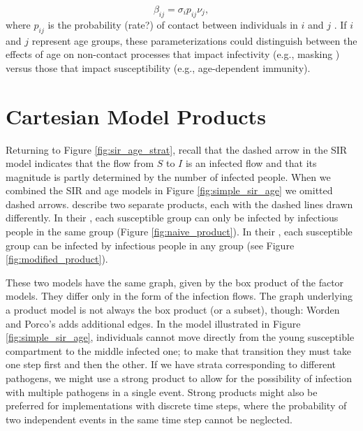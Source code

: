 \begin{equation}
    \beta_{ij} = \sigma_ip_{ij}\nu_j,
\end{equation}
where $p_{ij}$ is the probability (rate?) of contact between individuals in $i$ and $j$ . If $i$ and $j$ represent age groups, these parameterizations could distinguish between the effects of age on non-contact processes that impact infectivity (e.g., masking ) versus those that impact susceptibility (e.g., age-dependent immunity).

\section{Cartesian Model Products}\label{worden}

Returning to Figure \ref{fig:sir_age_strat}, recall that the dashed arrow in the SIR model indicates that the flow from $S$ to $I$ is an infected flow and that its magnitude is partly determined by the number of infected people. When we combined the SIR and age models in Figure \ref{fig:simple_sir_age} we omitted dashed arrows. \cite{worden2017products} describe two separate products, each with the dashed lines drawn differently. In their , each susceptible group can only be infected by infectious people in the same group (Figure \ref{fig:naive_product}). In their , each susceptible group can be infected by infectious people in any group (see Figure \ref{fig:modified_product}). 

These two models have the same graph, given by the box product of the factor models. They differ only in the form of the infection flows. The graph underlying a product model is not always the box product (or a subset), though: Worden and Porco's  adds additional edges. In the model illustrated in Figure \ref{fig:simple_sir_age}, individuals cannot move directly from the young susceptible compartment to the middle infected one; to make that transition they must take one step first and then the other. If we have strata corresponding to different pathogens, we might use a strong product to allow for the possibility of infection with multiple pathogens in a single event. Strong products might also be preferred for implementations with discrete time steps, where the probability of two independent events in the same time step cannot be neglected. 

